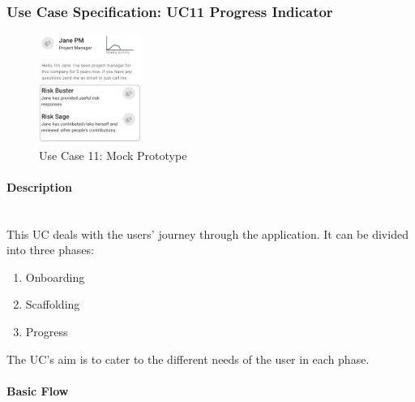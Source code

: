 
\newpage
\subsubsection{Use Case Specification: \ac{UC}11 Progress Indicator}
\label{sec:domainBbl}
\begin{figure}
	\includegraphics[width=0.3\textwidth]{Assets/UC_Screenshots/UC11S.png}
	\caption{Use Case 11: Mock Prototype}
	\label{fig:useCase11Detail}
\end{figure}

\paragraph*{Description}\mbox{}\\
This \ac{UC} deals with the users' journey through the application. 
It can be divided into three phases:
\begin{enumerate}
	\vspace{-3mm}
	\setlength\itemsep{-1em}
	
	\item Onboarding
	\item Scaffolding
	\item Progress
\end{enumerate}
\noindent
The \ac{UC}'s aim is to cater to the different needs of the user in each phase.
\\
\paragraph*{Basic Flow} \mbox{}\\

